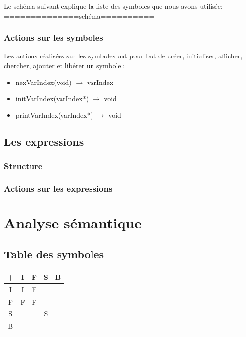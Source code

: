 \documentclass{article}
\begin{document}
Le schéma suivant explique la liste des symboles que nous avons utilisée: \\

==============schéma==========

\subsubsection*{Actions sur les symboles}
Les actions réalisées sur les symboles ont pour but de créer, initialiser, afficher, chercher, ajouter et libérer un symbole : \\
\begin{itemize}
\item nexVarIndex(void) $\rightarrow$ varIndex \\
\item initVarIndex(varIndex*) $\rightarrow$ void \\
\item printVarIndex(varIndex*) $\rightarrow$ void \\
\end{itemize}

\subsection{Les expressions}

\subsubsection*{Structure}

\subsubsection*{Actions sur les expressions}

\section{Analyse sémantique}

\subsection{Table des symboles}

\begin{center}
\begin{tabular}{|c|c|c|c|c|}
  \hline
  + & I & F & S & B \\
  \hline
  I & I & F &   &  \\
  \hline
  F & F & F &   & \\
  \hline
  S &   &   & S & \\
  \hline
  B & & & & \\
  \hline
\end{tabular}
\end{center}
\end{document}
